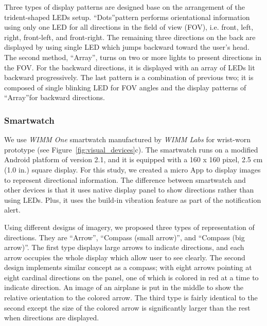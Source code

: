 \documentclass{sigchi}
\begin{document}
Three types of display patterns are designed base on the arrangement of the trident-shaped LEDs setup. \textquotedblleft Dots\textquotedblright pattern performs orientational information using only one LED for all directions in the field of view (FOV), i.e. front, left, right, front-left, and front-right. The remaining three directions on the back are displayed by using single LED which jumps backward toward the user's head. The second method, \textquotedblleft Array\textquotedblright, turns on two or more lights to present directions in the FOV. For the backward directions, it is displayed with an array of LEDs lit backward progressively. The last pattern is a combination of previous two; it is composed of single blinking LED for FOV angles and the display patterns of \textquotedblleft Array\textquotedblright for backward directions.

\subsubsection{Smartwatch}
We use \textit{WIMM One} smartwatch manufactured by \textit{WIMM Labs} for wrist-worn prototype (see Figure~\ref{fig:visual_devices}c). The smartwatch runs on a modified Android platform of version 2.1, and it is equipped with a 160 x 160 pixel, 2.5 cm (1.0 in.) square display. For this study, we created a micro App to display images to represent directional information. The difference between smartwatch and other devices is that it uses native display panel to show directions rather than using LEDs. Plus, it uses the build-in vibration feature as part of the notification alert.

Using different designs of imagery, we proposed three types of representation of directions. They are \textquotedblleft Arrow\textquotedblright, \textquotedblleft Compass (small arrow)\textquotedblright, and \textquotedblleft Compass (big arrow)\textquotedblright. The first type displays large arrows to indicate directions, and each arrow occupies the whole display which allow user to see clearly. The second design implements similar concept as a compass; with eight arrows pointing at eight cardinal directions on the panel, one of which is colored in red at a time   to indicate direction. An image of an airplane is put in the middle to show the relative orientation to the colored arrow. The third type is fairly identical to the second except the size of the colored arrow is significantly larger than the rest when directions are displayed.
\end{document}
